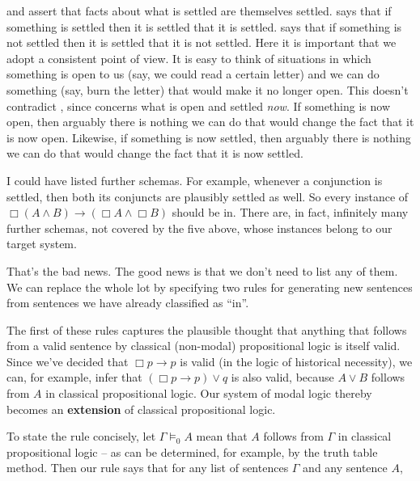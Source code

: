 
 and  assert that facts about what is settled are themselves
settled.  says that if something is settled then it is settled that it is
settled.  says that if something is not settled then it is settled that it
is not settled. Here it is important that we adopt a consistent point of view.
It is easy to think of situations in which something is open to us (say, we
could read a certain letter) and we can do something (say, burn the letter) that
would make it no longer open. This doesn't contradict , since 
concerns what is open and settled \emph{now}. If something is now open, then
arguably there is nothing we can do that would change the fact that it is now
open. Likewise, if something is now settled, then arguably there is nothing we
can do that would change the fact that it is now settled.

I could have listed further schemas. For example, whenever a conjunction is
settled, then both its conjuncts are plausibly settled as well. So every
instance of $\Box(A\land B) \to (\Box A \land \Box B)$ should be in. There are,
in fact, infinitely many further schemas, not covered by the five above, whose
instances belong to our target system.

That's the bad news. The good news is that we don't need to list any of them. We
can replace the whole lot by specifying two rules for generating new sentences
from sentences we have already classified as ``in''.

The first of these rules captures the plausible thought that anything that
follows from a valid sentence by classical (non-modal) propositional logic is
itself valid. Since we've decided that $\Box p \to p$ is valid (in the logic of
historical necessity), we can, for example, infer that $(\Box p \to p) \lor q$
is also valid, because $A \lor B$ follows from $A$ in classical propositional
logic.
Our system of modal
logic thereby becomes an \textbf{extension} of classical propositional
logic. \label{claim:extension}

To state the rule concisely, let $\Gamma \models_{0} A$ mean that $A$ follows
from $\Gamma$ in classical propositional logic -- as can be determined, for
example, by the truth table method. Then our rule says that for any list of
sentences $\Gamma$ and any sentence $A$,
%
\begin{principles}
\end{principles}

